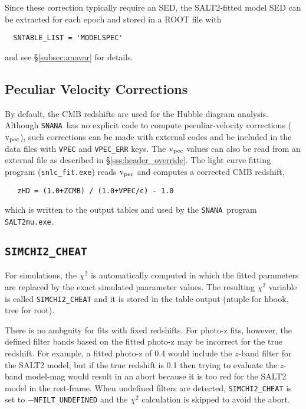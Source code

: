 \documentclass[12pt]{article}
\newcommand{\snana}{{\tt SNANA}}
\newcommand{\vpec}{{\rm v}_{\rm pec}}
\begin{document}
\medskip

Since these correction typically require an SED, the SALT2-fitted 
model SED can be extracted for each epoch and stored in a 
ROOT file with
\begin{verbatim}
  SNTABLE_LIST = 'MODELSPEC'
\end{verbatim}
and see \S\ref{subsec:anavar} for details.
% 

\subsection{Peculiar Velocity Corrections }
\label{subsec:vpec}

By default, the CMB redshifts are used for the Hubble diagram
analysis. Although \snana\ has no explicit code to compute
peculiar-velocity corrections ($\vpec$), such corrections
can be made with external codes and be included in the data files
with {\tt VPEC} and {\tt VPEC\_ERR} keys. The $\vpec$ values
can also be read from an external file as described in 
\S\ref{sss:header_override}. The light curve fitting program
({\tt snlc\_fit.exe}) reads $\vpec$ and computes a corrected
CMB redshift,
\begin{verbatim}
   zHD = (1.0+ZCMB) / (1.0+VPEC/c) - 1.0 
\end{verbatim}
which is written to the output tables and used by the \snana\ program
{\tt SALT2mu.exe}.



\subsection{{\tt SIMCHI2\_CHEAT} }
\label{subsec:simchi2_chear}

For simulations, the $\chi^2$ is automatically computed
in which the fitted parameters are replaced by the 
exact simulated paarameter values. The resulting $\chi^2$ variable
is called {\tt SIMCHI2\_CHEAT} and it is stored in the 
table output (ntuple for hbook, tree for root).

There is no ambguity for fits with fixed redshifts.
For photo-z fits, however, the defined filter bands based
on the fitted photo-z may be incorrect for the true redshift.
For example, a fitted photo-z of 0.4 would include the
$z$-band filter for the SALT2 model, 
but if the true redshift is 0.1 then trying to evaluate
the $z$-band model-mag would result in an abort because
it is too red for the SALT2 model in the rest-frame.
When undefined filters are detected,
{\tt SIMCHI2\_CHEAT}  is set to $-${\tt NFILT\_UNDEFINED}
and the $\chi^2$ calculation is skipped to avoid the abort.
\end{document}

